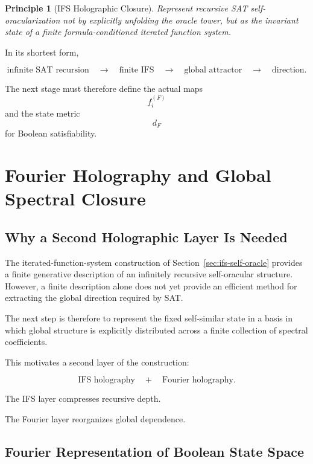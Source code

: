 \documentclass[11pt]{article}
\theoremstyle{plain}
\newtheorem{principle}[theorem]{Principle}
\theoremstyle{definition}
\begin{document}
\begin{principle}[IFS Holographic Closure]
\label{principle:ifs-holographic-closure}
Represent recursive SAT self-oracularization not by explicitly unfolding the
oracle tower, but as the invariant state of a finite formula-conditioned
iterated function system.
\end{principle}

In its shortest form,

\[
\boxed{
\text{infinite SAT recursion}
\quad\longrightarrow\quad
\text{finite IFS}
\quad\longrightarrow\quad
\text{global attractor}
\quad\longrightarrow\quad
\text{direction}.
}
\]

The next stage must therefore define the actual maps
\[
    f_i^{(F)}
\]
and the state metric
\[
    d_F
\]
for Boolean satisfiability.


\section{Fourier Holography and Global Spectral Closure}
\label{sec:fourier-holography}

\subsection{Why a Second Holographic Layer Is Needed}

The iterated-function-system construction of
Section~\ref{sec:ifs-self-oracle} provides a finite generative description of
an infinitely recursive self-oracular structure.  However, a finite
description alone does not yet provide an efficient method for extracting the
global direction required by SAT.

The next step is therefore to represent the fixed self-similar state in a
basis in which global structure is explicitly distributed across a finite
collection of spectral coefficients.

This motivates a second layer of the construction:

\[
\boxed{
\text{IFS holography}
\quad+\quad
\text{Fourier holography}.
}
\]

The IFS layer compresses recursive depth.

The Fourier layer reorganizes global dependence.

\subsection{Fourier Representation of Boolean State Space}
\end{document}
